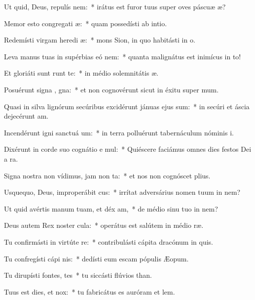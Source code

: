\item Ut quid, Deus, repulís  nem:~* irátus est furor tuus super oves páscuæ æ?
\item Memor esto congregati æ:~* quam possedísti ab intio.
\item Redemísti virgam heredi æ:~* mons Sion, in quo habitásti in o.
\item Leva manus tuas in supérbias eó  nem:~* quanta malignátus est inimícus in to!
\item Et gloriáti sunt  runt te:~* in médio solemnitátis æ.
\item Posuérunt signa , gna:~* et non cognovérunt sicut in éxitu super mum.
\item Quasi in silva lignórum secúribus excidérunt jánuas ejus  sum:~* in secúri et áscia dejecérunt am.
\item Incendérunt igni sanctuá um:~* in terra polluérunt tabernáculum nóminis i.
\item Dixérunt in corde suo cognátio e mul:~* Quiéscere faciámus omnes dies festos Dei a ra.
\item Signa nostra non vídimus, jam non  ta:~* et nos non cognóscet plius.
\item Usquequo, Deus, improperábit cus:~* irrítat adversárius nomen tuum in nem?
\item Ut quid avértis manum tuam, et déx am,~* de médio sinu tuo in nem?
\item Deus autem Rex noster  cula:~* operátus est salútem in médio ræ.
\item Tu confirmásti in virtúte  re:~* contribulásti cápita dracónum in quis.
\item Tu confregísti cápi nis:~* dedísti eum escam pópulis Æopum.
\item Tu dirupísti fontes,  tes~* tu siccásti flúvios than.
\item Tuus est dies, et   nox:~* tu fabricátus es auróram et lem.
